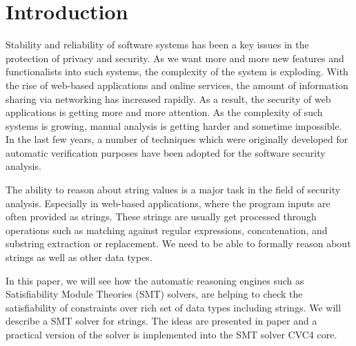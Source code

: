 \section{Introduction}
\label{sec:introduction}
Stability and reliability of software systems has been a key issues in the protection of privacy and security. As we want more and more new features and functionalists into such systems, the complexity of the system is exploding. With the rise of web-based applications and online services, the amount of information sharing via networking has increased rapidly. As a result, the security of web applications is getting more and more attention. As the complexity of such systems is growing, manual analysis is getting harder and sometime impossible.  In the last few years, a number of techniques which were originally developed for automatic verification purposes have been adopted for the software security analysis. 

The ability to reason about string values is a major task in the field of security analysis. Especially in web-based applications, where the program inputs are often provided as strings. These strings are usually get processed through operations such as matching against regular expressions, concatenation, and substring extraction or replacement. We need to be able to formally reason about strings as well as other data types.  


In this paper, we will see how the automatic reasoning engines such as Satisfiability Module Theories (SMT) solvers, are helping to check the satisfiability of constraints over rich set of data types including  strings. We will describe a  SMT solver for strings. The ideas are presented in paper \cite{main-paper} and a practical version of the solver is implemented into the SMT solver CVC4 \cite{cvc4_website} core.